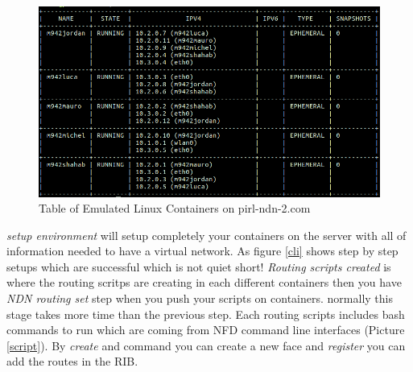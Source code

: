\begin{figure}[H]

\begin{center}

\includegraphics[scale = 0.3]{Pictures/table.png}

\caption{Table of Emulated Linux Containers on pirl-ndn-2.com} \label{table} 

\end{center}

\end{figure}


 
\textit{setup environment} will setup completely your containers on the server with all of information needed to have a virtual network. As figure \ref{cli} shows step by step setups which are successful which is not quiet short! \textit{Routing scripts created} is where the routing scritps are creating in each different containers then you have \textit{NDN routing set} step when you push your scripts on containers. normally this stage takes more time than the previous step. Each routing scripts includes bash commands to run which are coming from NFD command line interfaces (Picture \ref{script}). By \textit{create} and  command you can create a new face and \textit{register} you can add the routes in the RIB.   
 
